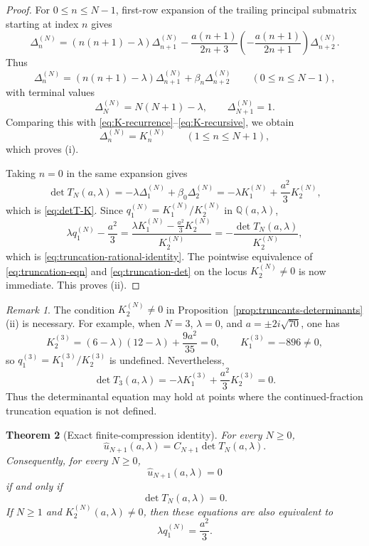 \documentclass[11pt,letterpaper]{amsart}
\numberwithin{equation}{section}
\theoremstyle{plain}
\newtheorem{theorem}{Theorem}
\theoremstyle{remark}
\newtheorem{remark}[theorem]{Remark}
\newcommand{\Q}{\mathbb{Q}}
\begin{document}
\begin{proof}
For \(0\le n\le N-1\), first-row expansion of the trailing principal submatrix starting at
index \(n\) gives
\[
\Delta_n^{(N)}
=
(n(n+1)-\lambda)\Delta_{n+1}^{(N)}
-\frac{a(n+1)}{2n+3}\left(-\frac{a(n+1)}{2n+1}\right)\Delta_{n+2}^{(N)}.
\]
Thus
\[
\Delta_n^{(N)}
=
(n(n+1)-\lambda)\Delta_{n+1}^{(N)}
+\beta_n\Delta_{n+2}^{(N)}
\qquad(0\le n\le N-1),
\]
with terminal values
\[
\Delta_N^{(N)}=N(N+1)-\lambda,
\qquad
\Delta_{N+1}^{(N)}=1.
\]
Comparing this with \eqref{eq:K-recurrence}--\eqref{eq:K-recursive}, we obtain
\[
\Delta_n^{(N)}=K_n^{(N)}
\qquad(1\le n\le N+1),
\]
which proves \textup{(i)}.

Taking \(n=0\) in the same expansion gives
\[
\det T_N(a,\lambda)
=
-\lambda\Delta_1^{(N)}+\beta_0\Delta_2^{(N)}
=
-\lambda K_1^{(N)}+\frac{a^2}{3}K_2^{(N)},
\]
which is \eqref{eq:detT-K}. Since \(q_1^{(N)}=K_1^{(N)}/K_2^{(N)}\) in \(\Q(a,\lambda)\),
\[
\lambda q_1^{(N)}-\frac{a^2}{3}
=
\frac{\lambda K_1^{(N)}-\frac{a^2}{3}K_2^{(N)}}{K_2^{(N)}}
=
-\frac{\det T_N(a,\lambda)}{K_2^{(N)}},
\]
which is \eqref{eq:truncation-rational-identity}. The pointwise equivalence of
\eqref{eq:truncation-eqn} and \eqref{eq:truncation-det} on the locus \(K_2^{(N)}\neq 0\)
is now immediate. This proves \textup{(ii)}.

\end{proof}

\begin{remark}\label{rem:truncation-domain}
The condition \(K_2^{(N)}\neq 0\) in Proposition~\ref{prop:truncants-determinants}\textup{(ii)}
is necessary. For example, when \(N=3\), \(\lambda=0\), and \(a=\pm 2i\sqrt{70}\), one has
\[
K_2^{(3)}=(6-\lambda)(12-\lambda)+\frac{9a^2}{35}=0,
\qquad
K_1^{(3)}=-896\neq 0,
\]
so \(q_1^{(3)}=K_1^{(3)}/K_2^{(3)}\) is undefined. Nevertheless,
\[
\det T_3(a,\lambda)
=
-\lambda K_1^{(3)}+\frac{a^2}{3}K_2^{(3)}
=
0.
\]
Thus the determinantal equation may hold at points where the continued-fraction truncation
equation is not defined.
\end{remark}

\begin{theorem}[Exact finite-compression identity]\label{thm:truncation-identity}
For every \(N\ge 0\),
\[
\widehat u_{N+1}(a,\lambda)=C_{N+1}\det T_N(a,\lambda).
\]
Consequently, for every \(N\ge 0\),
\[
\widehat u_{N+1}(a,\lambda)=0
\]
if and only if
\[
\det T_N(a,\lambda)=0.
\]
If \(N\ge 1\) and \(K_2^{(N)}(a,\lambda)\neq 0\), then these equations are also equivalent to
\[
\lambda q_1^{(N)}=\frac{a^2}{3}.
\]
\end{theorem}
\end{document}
